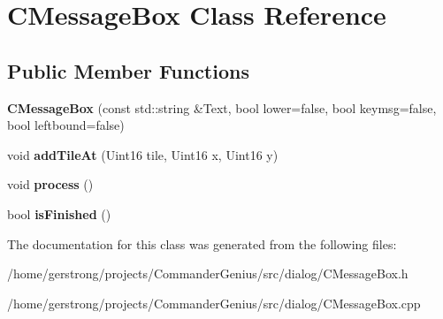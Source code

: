 \hypertarget{class_c_message_box}{
\section{CMessageBox Class Reference}
\label{class_c_message_box}
}
\subsection*{Public Member Functions}
\begin{DoxyCompactItemize}
\item 
\hypertarget{class_c_message_box_a7eccae88c10e6cebba5d07eecd8521f2}{
{\bfseries CMessageBox} (const std::string \&Text, bool lower=false, bool keymsg=false, bool leftbound=false)}
\label{class_c_message_box_a7eccae88c10e6cebba5d07eecd8521f2}

\item 
\hypertarget{class_c_message_box_a396af821c844b22f52436902178b2091}{
void {\bfseries addTileAt} (Uint16 tile, Uint16 x, Uint16 y)}
\label{class_c_message_box_a396af821c844b22f52436902178b2091}

\item 
\hypertarget{class_c_message_box_abd31c95c9cd80c3b82fb24c8feede5fd}{
void {\bfseries process} ()}
\label{class_c_message_box_abd31c95c9cd80c3b82fb24c8feede5fd}

\item 
\hypertarget{class_c_message_box_a289302f74a5d476ded2f4c2406300c7f}{
bool {\bfseries isFinished} ()}
\label{class_c_message_box_a289302f74a5d476ded2f4c2406300c7f}

\end{DoxyCompactItemize}


The documentation for this class was generated from the following files:\begin{DoxyCompactItemize}
\item 
/home/gerstrong/projects/CommanderGenius/src/dialog/CMessageBox.h\item 
/home/gerstrong/projects/CommanderGenius/src/dialog/CMessageBox.cpp\end{DoxyCompactItemize}
